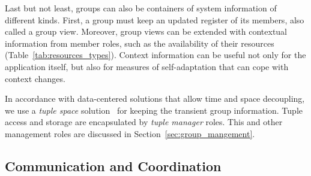 Last but not least, groups can also be containers of system information of different kinds. First, a group must keep an updated register of its members, also called a group view. Moreover, group views can be extended with contextual information from member roles, such as the availability of their resources (Table~\ref{tab:resources_types}). Context information can be useful not only for the application itself, but also for measures of self-adaptation that can cope with context changes. 

In accordance with data-centered solutions that allow time and space decoupling, we use a  \textit{tuple space} solution~\cite{Murphy:2006} for keeping the transient group information. %
Tuple access and storage are encapsulated by \textit{tuple manager} roles. This and other management roles are discussed in Section~\ref{sec:group_mangement}.


%

\subsection{Communication and Coordination}\label{sec:group_cc}

 


